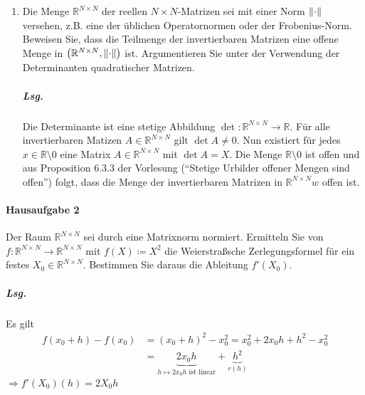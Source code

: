 \documentclass{scrreprt}
\begin{document}
\begin{enumerate}[1)]
\item Die Menge $\mathbb{R}^{N \times N}$ der reellen $N \times N$-Matrizen sei
  mit einer Norm $\norm{\cdot}$ versehen, z.B. eine der üblichen Operatornormen
  oder der Frobenius-Norm.
  Beweisen Sie, dass die Teilmenge der invertierbaren Matrizen eine offene Menge
  in $\qty(\mathbb{R}^{N \times N}, \norm{\cdot})$ ist.
  Argumentieren Sie unter der Verwendung der Determinanten quadratischer
  Matrizen.

  \subparagraph{Lsg.} Die Determinante ist eine stetige Abbildung
  $\det \colon \mathbb{R}^{N \times N} \to \mathbb{R}$.
  Für alle invertierbaren Matizen $A \in \mathbb{R}^{N \times N}$
  gilt $\det A \ne 0$.
  Nun existiert für jedes $x \in \mathbb{R} \setminus \qty{0}$
  eine Matrix $A \in \mathbb{R}^{N \times N}$ mit
  $\det A = X$.
  Die Menge $\mathbb{R} \setminus \qty{0}$ ist offen und aus
  Proposition 6.3.3 der Vorlesung
  (``Stetige Urbilder offener Mengen sind offen'')
  folgt, dass die Menge der invertierbaren Matrizen in
  $\mathbb{R}^{N \times N}w$ offen ist.
\end{enumerate}

\paragraph{Hausaufgabe 2} Der Raum $\mathbb{R}^{N \times N}$ sei durch eine
Matrixnorm normiert.
Ermitteln Sie von $f \colon \mathbb{R}^{N \times N} \to \mathbb{R}^{N \times N}$
mit $f(X) \coloneqq X^2$ die Weierstraßsche Zerlegungsformel für ein festes
$X_0 \in \mathbb{R}^{N \times N}$.
Bestimmen Sie daraus die Ableitung $f'(X_0)$.

\subparagraph{Lsg.}

Es gilt
\begin{align*}
  f(x_0 + h) - f(x_0) &= (x_0 + h)^2 - x_0^2 = x_0^2 + 2x_0h + h^2 - x_0^2 \\
                      &= \underset{h \mapsto 2x_0h \text{ ist linear}}{\underbrace{2x_0h}} +
                        \underset{r(h)}{\underbrace{h^2}}
\end{align*}
$\Rightarrow f'(X_0)(h) = 2X_0h$
\end{document}
